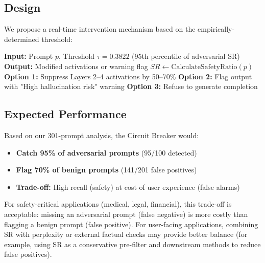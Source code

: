 \subsection{Design}

We propose a real-time intervention mechanism based on the empirically-determined threshold:

\begin{algorithmic}
\STATE \textbf{Input:} Prompt $p$, Threshold $\tau = 0.3822$ (95th percentile of adversarial SR)
\STATE \textbf{Output:} Modified activations or warning flag
\STATE
\STATE $SR \gets \text{CalculateSafetyRatio}(p)$
    \STATE \textbf{Option 1:} Suppress Layers 2--4 activations by 50--70\%
    \STATE \textbf{Option 2:} Flag output with "High hallucination risk" warning
    \STATE \textbf{Option 3:} Refuse to generate completion
\ENDIF
\end{algorithmic}

\subsection{Expected Performance}

Based on our 301-prompt analysis, the Circuit Breaker would:
\begin{itemize}
    \item \textbf{Catch 95\% of adversarial prompts} (95/100 detected)
    \item \textbf{Flag 70\% of benign prompts} (141/201 false positives)
    \item \textbf{Trade-off:} High recall (safety) at cost of user experience (false alarms)
\end{itemize}

For safety-critical applications (medical, legal, financial), this trade-off is acceptable: missing an adversarial prompt (false negative) is more costly than flagging a benign prompt (false positive). For user-facing applications, combining SR with perplexity or external factual checks may provide better balance (for example, using SR as a conservative pre-filter and downstream methods to reduce false positives).

